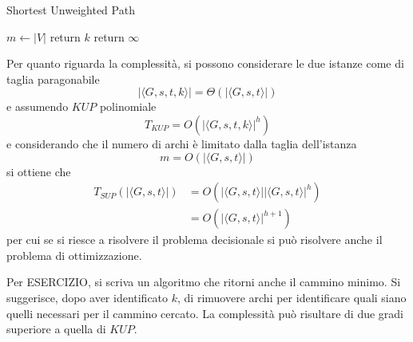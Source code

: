 \begin{algorithm}[H]
\caption{Shortest Unweighted Path}\label{alg:sup}
\begin{algorithmic}[1]
        \State $m \gets |V|$
                \State return $k$
            \EndIf
        \EndFor
        \State return $\infty$
    \EndProcedure
\end{algorithmic}
\end{algorithm}
\noindent
Per quanto riguarda la complessità, si possono considerare le due istanze come di taglia paragonabile
\begin{equation*}
    |\langle G, s, t, k \rangle| = \Theta \left( |\langle G, s, t \rangle| \right)
\end{equation*}
e assumendo $KUP$ polinomiale
\begin{equation*}
    T_{KUP} = O \left( |\langle G, s, t, k \rangle|^{h} \right)
\end{equation*}
e considerando che il numero di archi è limitato dalla taglia dell'istanza
\begin{equation}
    m = O \left( |\langle G, s, t \rangle| \right)
    \label{eq:tagliamgst}
\end{equation}
si ottiene che
\begin{align*}
    T_{SUP} \left( |\langle G, s, t \rangle| \right) &= O \left( |\langle G, s, t \rangle||\langle G, s, t \rangle|^{h} \right) \\
    &= O \left( |\langle G, s, t \rangle|^{h+1} \right)
\end{align*}
per cui se si riesce a risolvere il problema decisionale si può risolvere anche il problema di ottimizzazione.

Per ESERCIZIO, si scriva un algoritmo che ritorni anche il cammino minimo. Si suggerisce, dopo aver identificato $k$, di rimuovere archi per identificare quali siano quelli necessari per il cammino cercato. La complessità può risultare di due gradi superiore a quella di $KUP$.

